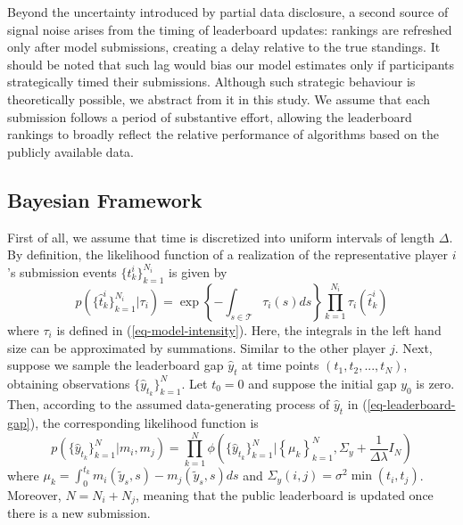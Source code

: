 \documentclass[mnsc]{informs3}
\begin{document}
Beyond the uncertainty introduced by partial data disclosure, a second source of signal noise arises from the timing of leaderboard updates: 
rankings are refreshed only after model submissions, creating a delay relative to the true standings.
It should be noted that such lag would bias our model estimates only if participants strategically timed their submissions.
Although such strategic behaviour is theoretically possible, we abstract from it in this study.
We assume that each submission follows a period of substantive effort, allowing the leaderboard rankings to broadly reflect the relative performance of algorithms based on the publicly available data.




\subsection{Bayesian Framework}

First of all, we assume that time is discretized into uniform intervals of length $\Delta$.
By definition, the likelihood function of a realization of the representative player $i$'s submission events $\{t^i_k\}_{k=1}^{N_i}$ is given by 
\begin{equation}\label{eq-ihpp-prob}
p\left(\{\hat{t}^i_k\}_{k=1}^{N_i} | \tau_i\right) = \exp\left\{-\int_{s\in\mathcal{T}}\tau_i(s)ds\right\}\prod_{k=1}^{N_i}\tau_i(\hat{t}^i_k)
\end{equation}
where $\tau_i$ is defined in (\ref{eq-model-intensity}). 
Here, the integrals in the left hand size can be approximated by summations.
Similar to the other player $j$. 
Next, suppose we sample the leaderboard gap $\hat{y}_t$ at time points $(t_1, t_2, ..., t_N)$, obtaining observations $\{\hat{y}_{t_k}\}^N_{k=1}$. 
Let $t_0 = 0$ and suppose the initial gap $y_0$ is zero. 
Then, according to the assumed data-generating process of $\hat{y}_t$ in (\ref{eq-leaderboard-gap}), the corresponding likelihood function is
\begin{equation}\label{eq-obs_gap-prob}
p\left(\{\hat{y}_{t_k}\}_{k=1}^N | m_i, m_j\right) = 
\prod_{k=1}^{N}
\phi\left(\{\hat{y}_{t_k}\}_{k=1}^N | \left\{\mu_k\right\}^N_{k=1}, \Sigma_y+\frac{1}{\Delta\lambda}I_N\right)
\end{equation}
where $\mu_k = \int_{0}^{t_{k}}m_i(\tilde{y}_s, s) - m_j(\tilde{y}_s, s)ds$ and $\Sigma_y(i, j) = \sigma^2\min(t_i,t_j)$. 
Moreover, $N = N_i + N_j$, meaning that the public leaderboard is updated once there is a new submission. 
\end{document}
